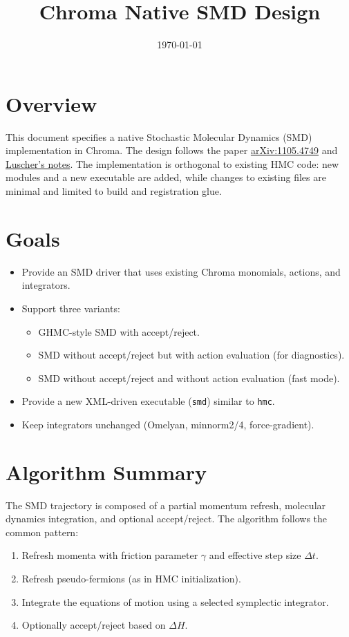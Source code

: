 \documentclass[11pt]{article}
\title{Chroma Native SMD Design}
\author{}
\date{\today}
\begin{document}
\maketitle

\section{Overview}
This document specifies a native Stochastic Molecular Dynamics (SMD) implementation
in Chroma. The design follows the paper \href{https://arxiv.org/pdf/1105.4749}{arXiv:1105.4749} and \href{https://luscher.web.cern.ch/luscher/notes/smd-ergodicity.pdf}{Luscher's notes}. The implementation is orthogonal to existing HMC
code: new modules and a new executable are added, while changes to existing files
are minimal and limited to build and registration glue.

\section{Goals}
\begin{itemize}[leftmargin=*]
  \item Provide an SMD driver that uses existing Chroma monomials, actions, and integrators.
  \item Support three variants:
    \begin{itemize}
      \item GHMC-style SMD with accept/reject.
      \item SMD without accept/reject but with action evaluation (for diagnostics).
      \item SMD without accept/reject and without action evaluation (fast mode).
    \end{itemize}
  \item Provide a new XML-driven executable (\texttt{smd}) similar to \texttt{hmc}.
  \item Keep integrators unchanged (Omelyan, minnorm2/4, force-gradient).
\end{itemize}


\section{Algorithm Summary}
The SMD trajectory is composed of a partial momentum refresh, molecular dynamics
integration, and optional accept/reject. The algorithm follows the common pattern:
\begin{enumerate}
  \item Refresh momenta with friction parameter \(\gamma\) and effective step size \(\Delta t\).
  \item Refresh pseudo-fermions (as in HMC initialization).
  \item Integrate the equations of motion using a selected symplectic integrator.
  \item Optionally accept/reject based on \(\Delta H\).
\end{enumerate}
\end{document}
